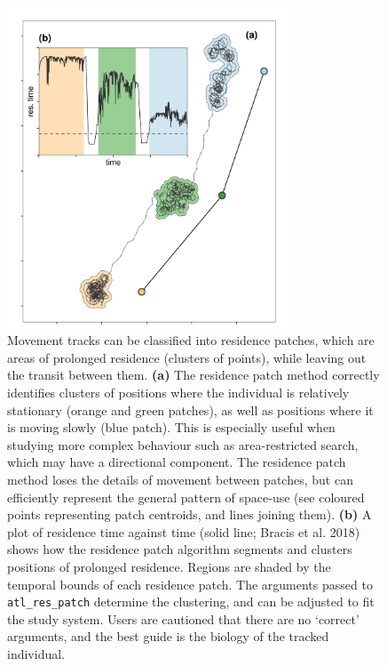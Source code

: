 \documentclass[10pt,paper=a4,headings=standardclasses
]{scrartcl}
\begin{document}
\begin{figure}[h!]
    \centering
    \includegraphics[width=0.75\textwidth]{figures/fig_05_residence.png}
    \caption{Movement tracks can be classified into residence patches, which are areas of prolonged residence (clusters of points), while leaving out the transit between them.
    \textbf{(a)} The residence patch method correctly identifies clusters of positions where the individual is relatively stationary (orange and green patches), as well as positions where it is moving slowly (blue patch).
    This is especially useful when studying more complex behaviour such as area-restricted search, which may have a directional component.
    The residence patch method loses the details of movement between patches, but can efficiently represent the general pattern of space-use (see coloured points representing patch centroids, and lines joining them).
    \textbf{(b)} A plot of residence time against time (solid line; Bracis et al. 2018) shows how the residence patch algorithm segments and clusters positions of prolonged residence. 
    Regions are shaded by the temporal bounds of each residence patch.
    The arguments passed to \texttt{atl\_res\_patch} determine the clustering, and can be adjusted to fit the study system.
    Users are cautioned that there are no `correct' arguments, and the best guide is the biology of the tracked individual.}
    \label{fig:figure_residence_patch}
\end{figure}
\end{document}
